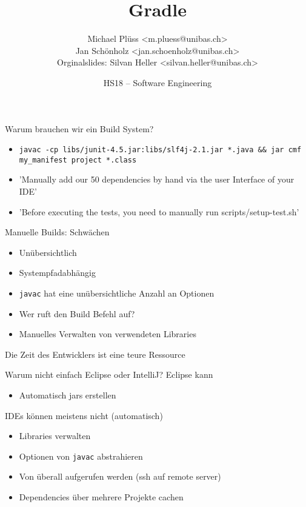 \documentclass{beamer}
\title              {Gradle}
\author             {Michael Plüss \textless m.pluess@unibas.ch\textgreater \\
    Jan Schönholz \textless jan.schoenholz@unibas.ch\textgreater \\
    \tiny{Orginalslides: Silvan Heller \textless silvan.heller@unibas.ch\textgreater}}
\institute          {Department Mathematik \& Informatik, Universität Basel}
\date               {HS18 -- Software Engineering}
\begin{document}
\begin{frame}[t,plain]
\titlepage
\end{frame}
\begin{frame}{Warum brauchen wir ein Build System?}
	\begin{itemize}
		\item \texttt{javac -cp libs/junit-4.5.jar:libs/slf4j-2.1.jar *.java \&\& jar cmf my\_manifest project *.class}
		\item 'Manually add our 50 dependencies by hand via the user Interface of your IDE'
		\item 'Before executing the tests, you need to manually run scripts/setup-test.sh' 
	\end{itemize}
\end{frame}

\begin{frame}{Manuelle Builds: Schwächen}
	\begin{itemize}
		\item Unübersichtlich
		\item Systempfadabhängig
		\item \texttt{javac} hat eine unübersichtliche Anzahl an Optionen
		\item Wer ruft den Build Befehl auf? 
		\item Manuelles Verwalten von verwendeten Libraries
	\end{itemize}
		\begin{center}
			\begin{large}
				Die Zeit des Entwicklers ist eine teure Ressource
			\end{large}
		\end{center}
\end{frame}

\begin{frame}{Warum nicht einfach Eclipse oder IntelliJ?}
	Eclipse kann
	\begin{itemize}
		\item Automatisch jars erstellen
	\end{itemize}
	IDEs können meistens nicht (automatisch)
	\begin{itemize}
		\item Libraries verwalten
		\item Optionen von \texttt{javac} abstrahieren
		\item Von überall aufgerufen werden (ssh auf remote server)
		\item Dependencies über mehrere Projekte cachen
	\end{itemize}
\end{frame}
\end{document}

